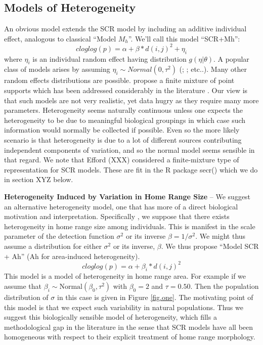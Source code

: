\subsection{Models of Heterogeneity}

An obvious model extends the SCR model by including an additive individual effect, analogous to classical ``Model $M_{h}$''. We'll call this model ``SCR+Mh'':
\[
 cloglog(p) = \alpha + \beta*d(i,j)^2  + \eta_{i}
\]
where $\eta_{i}$ is an individual random effect having distribution
$g(\eta|\theta)$.  A popular class of models arises by assuming
$\eta_{i} \sim Normal(0,\tau^{2})$ (\citet{coull_agresti:1999};
\citet{dorazio_royle:2003}; etc..).  Many other random effects
distributions are possible. \citet{norris_pollock:1996} propose a
finite mixture of point supports which has been addressed considerably
in the literature \citep{pledger:2003; dorazio_royle:2003; link:2003}.  Our view is that such models are not very realistic, yet data hugry as they require many more parameters. Heterogeneity seems naturally continuous unless one expects the heterogeneity to be due to meaningful biological groupings in which case such information would normally be collected if possible.  Even so the more likely scenario is that heterogeneity is due to a lot of different sources contributing independent components of variation, and so the normal model seems sensible in that regard. We note that Efford (XXX) considered a finite-mixture type of representation for SCR models. These are fit in the R package secr() which we do in section XYZ below.

{\bf Heterogeneity Induced by Variation in Home Range Size} -- We suggest an alternative heterogeneity model, one that has more of a direct biological motivation and interpretation. Specifically , we suppose that there exists heterogeneity in home range size among individuals. This is manifest in the scale parameter of the detection function $\sigma^{2}$ or its inverse $\beta = 1/\sigma^{2}$. We might
thus assume a distribution for either $\sigma^{2}$ or its inverse,
$\beta$.  We thus propose ``Model SCR + Ah'' (Ah for area-induced
heterogeneity).
\[
 cloglog(p) = \alpha + \beta_{i}*d(i,j)^2
\]
This model is a model of heterogeneity in home range area. For example
if we assume that $\beta_{i} \sim \mbox{Normal}(\beta_0,\tau^{2})$
with $\beta_{0} = 2$ and $\tau = 0.50$. Then the population
distribution of $\sigma$ in this case is given in Figure
\ref{fig.one}. The motivating point of this model is that we expect
such variability in natural populations. Thus we suggest this
biologically sensible model of heterogeneity, which fills a
methodological gap in the literature in the sense that SCR models have
all been homogeneous with respect to their explicit treatment of home
range morphology.

